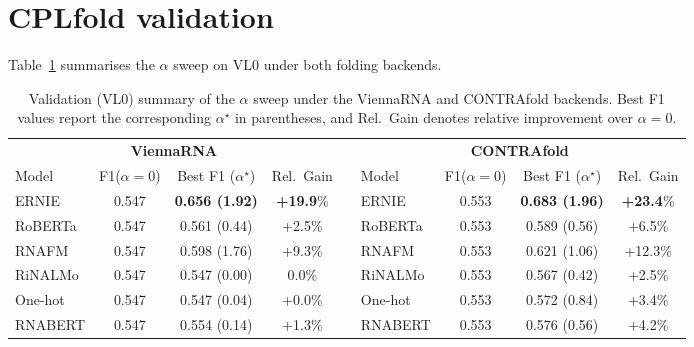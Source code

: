 \documentclass[logo,bsc,singlespacing,parskip]{infthesis}
\begin{document}
\section{CPLfold validation}
\label{sec:appendix_cplfold}

Table~\ref{tab:alpha_vl0_summary} summarises the $\alpha$ sweep on VL0 under both folding backends.

\begin{table}[H]
\centering
\small
\setlength{\tabcolsep}{2pt}
\caption{Validation (VL0) summary of the $\alpha$ sweep under the ViennaRNA and CONTRAfold backends. Best F1 values report the corresponding $\alpha^\star$ in parentheses, and Rel.\ Gain denotes relative improvement over $\alpha=0$.}
\label{tab:alpha_vl0_summary}
\begin{tabular}{lccc c lccc}
\toprule
\multicolumn{4}{c}{\textbf{ViennaRNA}} & &
\multicolumn{4}{c}{\textbf{CONTRAfold}} \\
\cmidrule(lr){1-4} \cmidrule(lr){6-9}
Model & F1($\alpha{=}0$) & Best F1 ($\alpha^\star$) & Rel.\ Gain & &
Model & F1($\alpha{=}0$) & Best F1 ($\alpha^\star$) & Rel.\ Gain \\
\midrule
ERNIE   & 0.547 & \textbf{0.656 (1.92)} & \textbf{+19.9}\% && ERNIE   & 0.553 & \textbf{0.683 (1.96)} & \textbf{+23.4}\% \\
RoBERTa & 0.547 & 0.561 (0.44) & +2.5\% && RoBERTa & 0.553 & 0.589 (0.56) & +6.5\% \\
RNAFM   & 0.547 & 0.598 (1.76) & +9.3\% && RNAFM   & 0.553 & 0.621 (1.06) & +12.3\% \\
RiNALMo & 0.547 & 0.547 (0.00) & 0.0\% && RiNALMo & 0.553 & 0.567 (0.42) & +2.5\% \\
One-hot & 0.547 & 0.547 (0.04) & +0.0\% && One-hot & 0.553 & 0.572 (0.84) & +3.4\% \\
RNABERT & 0.547 & 0.554 (0.14) & +1.3\% && RNABERT & 0.553 & 0.576 (0.56) & +4.2\% \\
\bottomrule
\end{tabular}
\end{table}
\end{document}

